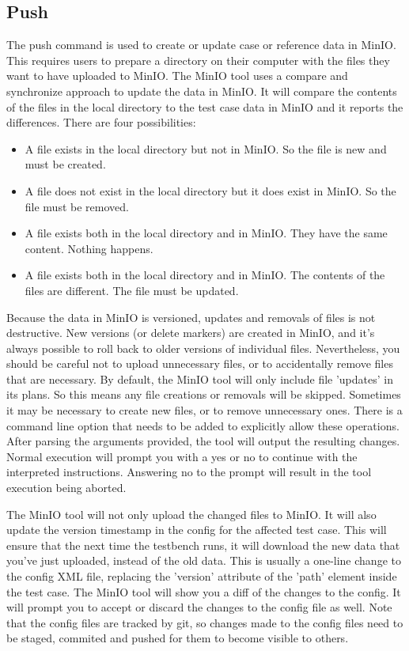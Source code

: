 \documentclass{deltares_memo}
\begin{document}
\subsection{Push}
The push command is used to create or update case or reference data in MinIO. This requires users to prepare a directory on their computer with the files they want to have uploaded to MinIO. The MinIO tool uses a compare and synchronize approach to update the data in MinIO. It will compare the contents of the files in the local directory to the test case data in MinIO and it reports the differences. There are four possibilities:
\newline
\begin{itemize}
	\item A file exists in the local directory but not in MinIO. So the file is new and must be created.
	\item A file does not exist in the local directory but it does exist in MinIO. So the file must be removed.
	\item A file exists both in the local directory and in MinIO. They have the same content. Nothing happens.
	\item A file exists both in the local directory and in MinIO. The contents of the files are different. The file must be updated.
\end{itemize}
Because the data in MinIO is versioned, updates and removals of files is not destructive. New versions (or delete markers) are created in MinIO, and it's always possible to roll back to older versions of individual files. Nevertheless, you should be careful not to upload unnecessary files, or to accidentally remove files that are necessary. By default, the MinIO tool will only include file 'updates' in its plans. So this means any file creations or removals will be skipped. Sometimes it may be necessary to create new files, or to remove unnecessary ones. There is a command line option that needs to be added to explicitly allow these operations. After parsing the arguments provided, the tool will output the resulting changes. Normal execution will prompt you with a yes or no to continue with the interpreted instructions. Answering no to the prompt will result in the tool execution being aborted.

The MinIO tool will not only upload the changed files to MinIO. It will also update the version timestamp in the config for the affected test case. This will ensure that the next time the testbench runs, it will download the new data that you've just uploaded, instead of the old data. This is usually a one-line change to the config XML file, replacing the 'version' attribute of the 'path' element inside the test case. The MinIO tool will show you a diff of the changes to the config. It will prompt you to accept or discard the changes to the config file as well. Note that the config files are tracked by git, so changes made to the config files need to be staged, commited and pushed for them to become visible to others.
\end{document}
